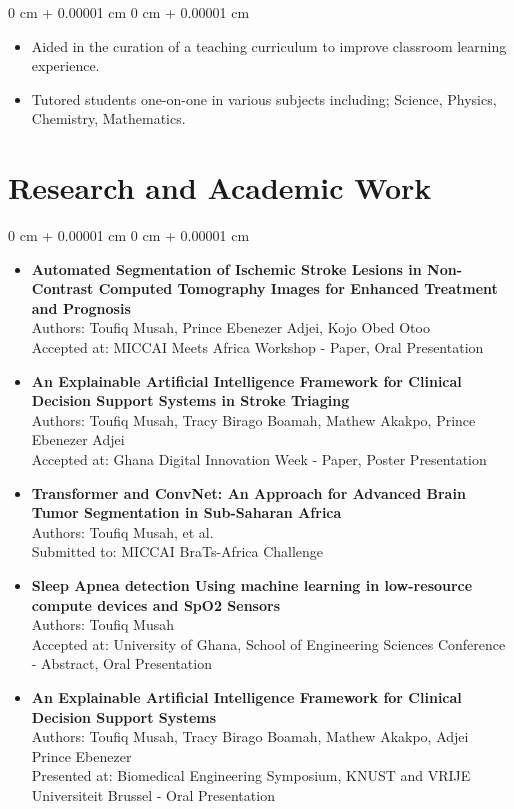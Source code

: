 \documentclass[10pt, letterpaper]{article}
\newenvironment{highlights}{
    \begin{itemize}[
        topsep=0.10 cm,
        parsep=0.10 cm,
        partopsep=0pt,
        itemsep=0pt,
        leftmargin=0 cm + 10pt
    ]
}{
    \end{itemize}
} %
\newenvironment{onecolentry}{
    \begin{adjustwidth}{
        0 cm + 0.00001 cm
    }{
        0 cm + 0.00001 cm
    }
}{
    \end{adjustwidth}
} %
\begin{document}
    \vspace{0.10 cm}
    \begin{onecolentry}
        \begin{highlights}
            \item Aided in the curation of a teaching curriculum to improve classroom learning experience.
            \item Tutored students one-on-one in various subjects including; Science, Physics, Chemistry, Mathematics.
        \end{highlights}
    \end{onecolentry}

    \section{Research and Academic Work}

    \begin{onecolentry}
        \begin{highlights}
            \item \textbf{Automated Segmentation of Ischemic Stroke Lesions in Non-Contrast Computed Tomography Images for Enhanced Treatment and Prognosis}\\
            Authors: Toufiq Musah, Prince Ebenezer Adjei, Kojo Obed Otoo\\
            Accepted at: MICCAI Meets Africa Workshop - Paper, Oral Presentation
            \item \textbf{An Explainable Artificial Intelligence Framework for Clinical Decision Support Systems in Stroke Triaging}\\
            Authors: Toufiq Musah, Tracy Birago Boamah, Mathew Akakpo, Prince Ebenezer Adjei\\
            Accepted at: Ghana Digital Innovation Week - Paper, Poster Presentation
            \item \textbf{Transformer and ConvNet: An Approach for Advanced Brain Tumor Segmentation in Sub-Saharan Africa}\\
            Authors: Toufiq Musah, et al.\\
            Submitted to: MICCAI BraTs-Africa Challenge
            \item \textbf{Sleep Apnea detection Using machine learning in low-resource compute devices and SpO2 Sensors}\\
            Authors: Toufiq Musah\\
            Accepted at: University of Ghana, School of Engineering Sciences Conference - Abstract, Oral Presentation
            \item \textbf{An Explainable Artificial Intelligence Framework for Clinical Decision Support Systems}\\
            Authors: Toufiq Musah, Tracy Birago Boamah, Mathew Akakpo, Adjei Prince Ebenezer\\
            Presented at: Biomedical Engineering Symposium, KNUST and VRIJE Universiteit Brussel - Oral Presentation
        \end{highlights}
    \end{onecolentry}
\end{document}
